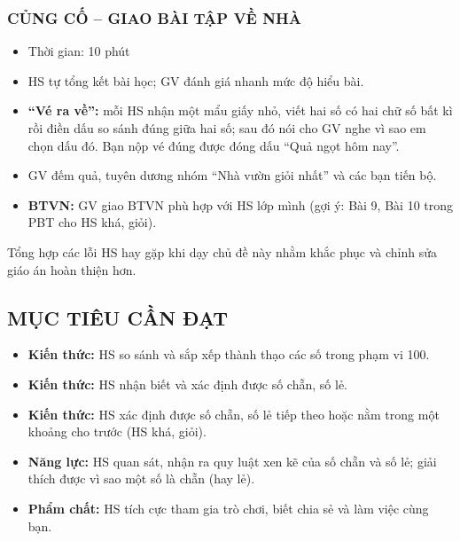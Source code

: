 \documentclass[../main.tex]{subfiles}
\begin{document}
\subsubsection{CỦNG CỐ -- GIAO BÀI TẬP VỀ NHÀ}
\begin{hd}
    \begin{itemize}
        \item Thời gian: 10 phút
        \item HS tự tổng kết bài học; GV đánh giá nhanh mức độ hiểu bài.
    \end{itemize}
\end{hd}
\begin{itemize}
    \item \textbf{“Vé ra về”:} mỗi HS nhận một mẩu giấy nhỏ, viết hai số có hai chữ số bất kì rồi điền dấu so sánh đúng giữa hai số; sau đó nói cho GV nghe vì sao em chọn dấu đó. Bạn nộp vé đúng được đóng dấu “Quả ngọt hôm nay”.
    \item GV đếm quả, tuyên dương nhóm “Nhà vườn giỏi nhất” và các bạn tiến bộ.
    \item \textbf{BTVN:} GV giao BTVN phù hợp với HS lớp mình (gợi ý: Bài 9, Bài 10 trong PBT cho HS khá, giỏi).
\end{itemize}

Tổng hợp các lỗi HS hay gặp khi dạy chủ đề này nhằm khắc phục và chỉnh sửa giáo án hoàn thiện hơn.
\par\medskip
\noindent\TTcham[\linewidth]\par\medskip
\noindent\TTcham[\linewidth]\par\medskip
\noindent\TTcham[\linewidth]

\newpage
\setcounter{subsection}{0}
\begin{center}
\end{center}

\subsection{MỤC TIÊU CẦN ĐẠT}
\begin{itemize}
    \item \textbf{Kiến thức:} HS so sánh và sắp xếp thành thạo các số trong phạm vi 100.
    \item \textbf{Kiến thức:} HS nhận biết và xác định được số chẵn, số lẻ.
    \item \textbf{Kiến thức:} HS xác định được số chẵn, số lẻ tiếp theo hoặc nằm trong một khoảng cho trước (HS khá, giỏi).
    \item \textbf{Năng lực:} HS quan sát, nhận ra quy luật xen kẽ của số chẵn và số lẻ; giải thích được vì sao một số là chẵn (hay lẻ).
    \item \textbf{Phẩm chất:} HS tích cực tham gia trò chơi, biết chia sẻ và làm việc cùng bạn.
\end{itemize}
\end{document}
